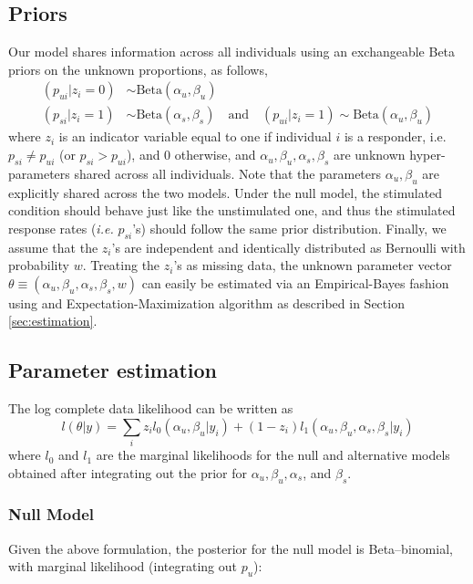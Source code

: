 \documentclass[11pt]{article}
\begin{document}
\subsection{Priors}
Our model shares information across all individuals using an exchangeable Beta priors on the unknown proportions, as follows, 
 \begin{align}
(p_{ui} | z_{i}=0)  &\sim \mathrm{Beta}(\alpha_u, \beta_u)\label{eq:prior-null}\\
(p_{si} | z_{i}=1)  &\sim \mathrm{Beta}(\alpha_s,\beta_s) \quad\mathrm{and}\quad (p_{ui}|z_{i}=1) \sim \mathrm{Beta}(\alpha_u, \beta_u) \label{eq:prior-alternative}
 \end{align}
where $z_i$ is an indicator variable equal to one if individual $i$ is a responder, i.e.  $p_{si}\ne p_{ui}$ (or $p_{si}> p_{ui}$), and 0 otherwise, and $\alpha_u, \beta_u, \alpha_s,\beta_s$ are unknown hyper-parameters shared across all individuals. Note that the parameters $\alpha_u, \beta_u$ are explicitly shared across the two models. Under the null model, the stimulated condition should behave just like the unstimulated one, and thus
the stimulated response rates (\textit{i.e.} $p_{si}$'s) should follow the same prior distribution. Finally, we assume that the $z_i$'s are independent and identically distributed as Bernoulli with probability $w$.
Treating the $z_i$'s as missing data, the unknown parameter vector $\theta\equiv(\alpha_u, \beta_u, \alpha_s,\beta_s, w)$ can easily be estimated via an Empirical-Bayes fashion using and Expectation-Maximization algorithm as described in Section \ref{sec:estimation}. 

\subsection{Parameter estimation}
The log complete data likelihood can be written as 
\begin{equation}
l(\theta|y)=\sum_i z_i l_0(\alpha_u, \beta_u|y_i) +(1-z_i) l_1(\alpha_u, \beta_u, \alpha_s, \beta_s|y_i)
\end{equation}
where $l_0$ and $l_1$ are the marginal likelihoods for the null and alternative models obtained after integrating out the prior for $\alpha_u, \beta_u, \alpha_s$, and $\beta_s$. 

\subsubsection{Null Model}
Given the above formulation, the posterior for the null model is Beta--binomial, with marginal likelihood (integrating out $p_u$):
\end{document}
